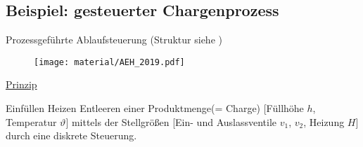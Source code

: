 \subsection{Beispiel: gesteuerter Chargenprozess}
Prozessgeführte Ablaufsteuerung (Struktur siehe )

\begin{figure}[H]
	\centering
	\texttt{[image: material/AEH\_2019.pdf]}
\end{figure}


\underline{Prinzip}

Einfüllen \textrightarrow Heizen \textrightarrow Entleeren einer Produktmenge(= Charge) [Füllhöhe $h$, Temperatur $\vartheta$] mittels der Stellgrößen [Ein- und Auslassventile $v_1$, $v_2$, Heizung $H$] durch eine diskrete Steuerung.